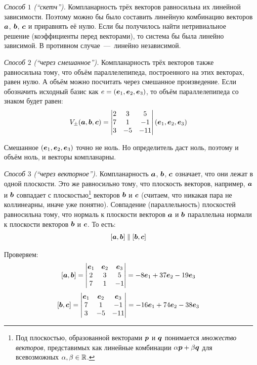 \documentclass[a4paper,12pt]{article}
\begin{document}
  \begin{solution}
    \leavevmode
    
    \emph{Способ $1$ (``скетч'').}
    Компланарность трёх векторов равносильна их линейной зависимости.
    Поэтому можно бы было составить линейную комбинацию векторов $\boldsymbol a$, $\boldsymbol b$, $\boldsymbol c$ и приравнять её нулю.
    Если бы получилось найти нетривиальное решение (коэффициенты перед векторами), то система бы была линейно зависимой.
    В противном случае~---~линейно независимой.
    
    \medskip
    
    \emph{Способ $2$ (``через смешанное'').}
    Компланарность трёх векторов также равносильна тому, что объём параллелепипеда, построенного на этих векторах, равен нулю.
    А объём можно посчитать через смешанное произведение.
    Если обозначить исходный базис как $e \hm= (\bds e_1, \bds e_2, \bds e_3)$, то объём параллелепипеда со знаком будет равен:
    \[
      V_{\pm}(\boldsymbol a, \boldsymbol b, \boldsymbol c) = \begin{vmatrix}
        2 & 3 & 5\\
        7 & 1 & -1\\
        3 & -5 & -11
      \end{vmatrix} (\boldsymbol e_1, \boldsymbol e_2, \boldsymbol e_3)
    \]
    
    Смешанное $(\boldsymbol e_1, \boldsymbol e_2, \boldsymbol e_3)$ точно не ноль.
    Но определитель даст ноль, поэтому и объём ноль, и векторы компланарны.
    
    \medskip
    
    \emph{Способ $3$ (``через векторное'').}
    Компланарность $\boldsymbol a$, $\boldsymbol b$, $\boldsymbol c$ означает, что они лежат в одной плоскости.
    Это же равносильно тому, что плоскость векторов, например, $\boldsymbol a$ и $\boldsymbol b$ совпадает с плоскостью\footnote{Под плоскостью, образованной векторами $\boldsymbol p$ и $\boldsymbol q$ понимается \emph{множество векторов}, представимых как линейные комбинации $\alpha \bds p \hm+ \beta \bds q$ для всевозможных $\alpha, \beta \hm\in \RR$.} векторов $\boldsymbol b$ и $\boldsymbol c$ (считаем, что никакая пара не коллинеарны, иначе уже понятно).
    Совпадение (параллельность) плоскостей равносильна тому, что нормаль к плоскости векторов $\boldsymbol a$ и $\boldsymbol b$ параллельна нормали к плоскости векторов $\boldsymbol b$ и $\boldsymbol c$.
    То есть:
    \[
      [\boldsymbol a, \boldsymbol b] \parallel [\boldsymbol b, \boldsymbol c]
    \]
    
    Проверяем:
    \[
      [\boldsymbol a, \boldsymbol b] = \begin{vmatrix}
        \boldsymbol e_1 & \boldsymbol e_2 & \boldsymbol e_3\\
        2 & 3 & 5\\
        7 & 1 & -1
      \end{vmatrix} = -8 \boldsymbol e_1 + 37 \boldsymbol e_2 - 19 \boldsymbol e_3
    \]
    \[
      [\boldsymbol b, \boldsymbol c] = \begin{vmatrix}
        \boldsymbol e_1 & \boldsymbol e_2 & \boldsymbol e_3\\
        7 & 1 & -1\\
        3 & -5 & -11
      \end{vmatrix} = -16 \boldsymbol e_1 + 74 \boldsymbol e_2 - 38 \boldsymbol e_3
    \]
    

\end{solution}
\end{document}
